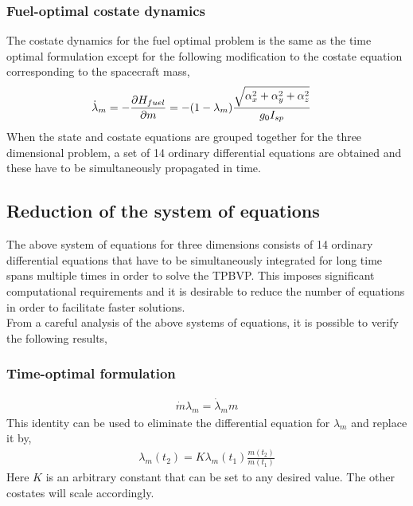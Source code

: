 \subsubsection{Fuel-optimal costate dynamics}
The costate dynamics for the fuel optimal problem is the same as the time optimal formulation except for the following modification to the costate equation corresponding to the spacecraft mass,
\begin{align}
	\dot{\lambda}_m&=-\frac{\partial \boldmath{H_{fuel}}}{\partial m}=-(1-\lambda_m)\frac{\sqrt{\alpha_x^2+\alpha_y^2+\alpha_z^2}}{g_0 I_{sp}}
\end{align}
When the state and costate equations are grouped together for the three dimensional problem, a set of 14 ordinary differential equations are obtained and these have to be simultaneously propagated in time. 
\subsection{Reduction of the system of equations}
The above system of equations for three dimensions consists of 14 ordinary differential equations that have to be simultaneously integrated for long time spans multiple times in order to solve the TPBVP. This imposes significant computational requirements and it is desirable to reduce the number of equations in order to facilitate faster solutions.\\
From a careful analysis of the above systems of equations, it is possible to verify the following results,
\subsubsection{Time-optimal formulation}
\begin{align}
	\dot{m}\lambda_m=\dot{\lambda}_m m
\end{align}
This identity can be used to eliminate the differential equation for $\lambda_m$ and replace it by,
\begin{align}
	\lambda_m(t_2)=K\lambda_m(t_1)\frac{m(t_2)}{m(t_1)}
\end{align}
Here $K$ is an arbitrary constant that can be set to any desired value. The other costates will scale accordingly.
